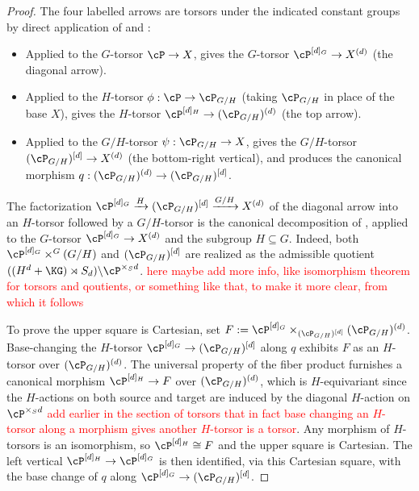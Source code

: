 \begin{proof}
The four labelled arrows are torsors under the indicated constant groups by direct application of  and :
\begin{itemize}
    \item Applied to the $G$-torsor $\cP \to X$,  gives the $G$-torsor $\cP^{[d]_G} \to X^{(d)}$ (the diagonal arrow).
    \item Applied to the $H$-torsor $\phi: \cP \to \cP_{G/H}$ (taking $\cP_{G/H}$ in place of the base $X$),  gives the $H$-torsor $\cP^{[d]_H} \to (\cP_{G/H})^{(d)}$ (the top arrow).
    \item Applied to the $G/H$-torsor $\psi: \cP_{G/H} \to X$,  gives the $G/H$-torsor $(\cP_{G/H})^{[d]} \to X^{(d)}$ (the bottom-right vertical), and  produces the canonical morphism $q : (\cP_{G/H})^{(d)} \to (\cP_{G/H})^{[d]}$.
\end{itemize}

The factorization $\cP^{[d]_G} \xrightarrow{H} (\cP_{G/H})^{[d]} \xrightarrow{G/H} X^{(d)}$ of the diagonal arrow into an $H$-torsor followed by a $G/H$-torsor is the canonical decomposition of , applied to the $G$-torsor $\cP^{[d]_G} \to X^{(d)}$ and the subgroup $H \subseteq G$. 
Indeed, both $\cP^{[d]_G} \times^G (G/H)$ and $(\cP_{G/H})^{[d]}$ are realized as the admissible quotient 
$((H^d + \KG) \rtimes S_d) \backslash \cP^{\times_S d}$.
\textcolor{red}{here maybe add more info, like isomorphism theorem for torsors and qoutients, or something like that, to make it more clear, from which it follows}

To prove the upper square is Cartesian, set $F := \cP^{[d]_G} \times_{(\cP_{G/H})^{[d]}} (\cP_{G/H})^{(d)}$. 
Base-changing the $H$-torsor $\cP^{[d]_G} \to (\cP_{G/H})^{[d]}$ along $q$ exhibits $F$ as an $H$-torsor over $(\cP_{G/H})^{(d)}$. 
The universal property of the fiber product furnishes a canonical morphism $\cP^{[d]_H} \to F$ over $(\cP_{G/H})^{(d)}$, 
which is $H$-equivariant since the $H$-actions on both source and target are induced by the diagonal $H$-action on $\cP^{\times_S d}$ \textcolor{red}{add earlier in the section of torsors that in fact base changing an $H$-torsor along a morphism gives another $H$-torsor
 is a torsor}. 
 Any morphism of $H$-torsors is an isomorphism, so $\cP^{[d]_H} \cong F$ and the upper square is Cartesian. The left vertical $\cP^{[d]_H} \to \cP^{[d]_G}$ is then identified, via this Cartesian square, with the base change of $q$ along $\cP^{[d]_G} \to (\cP_{G/H})^{[d]}$.
\end{proof}

